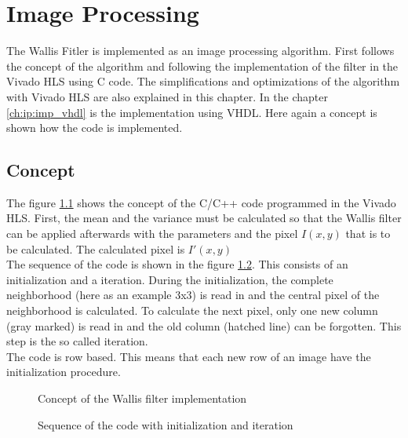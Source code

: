 %
%
\chapter{Image Processing}  \label{chapt:image_processing}
The Wallis Fitler is implemented as an image processing algorithm. First follows the concept of the algorithm and following the implementation of the filter in the Vivado HLS using C code. The simplifications and optimizations of the algorithm with Vivado HLS are also explained in this chapter. In the chapter \ref{ch:ip:imp_vhdl} is the implementation using VHDL. Here again a concept is shown how the code is implemented.

\section{Concept} \label{ch:ip:concept}
The figure \ref{fig:concept} shows the concept of the C/C++ code programmed in the Vivado HLS. First, the mean and the variance must be calculated so that the Wallis filter can be applied afterwards with the parameters and the pixel $I(x,y)$ that is to be calculated. The calculated pixel is $I'(x,y)$ \\
The sequence of the code is shown in the figure \ref{fig:sequence}. This consists of an initialization and a iteration. During the initialization, the complete neighborhood (here as an example 3x3) is read in and the central pixel of the neighborhood is calculated. To calculate the next pixel, only one new column (gray marked) is read in and the old column (hatched line) can be forgotten. This step is the so called iteration.\\
The code is row based. This means that each new row of an image have the initialization procedure.

\begin{figure}[tb!]
    \centering
    \begin{adjustbox}{max width=\textwidth}
        
    \end{adjustbox}
    \caption{Concept of the Wallis filter implementation}
    \label{fig:concept}
\end{figure}

\begin{figure}[tb!]
    \centering
    \begin{adjustbox}{max width=\textwidth}
        
    \end{adjustbox}
    \caption{Sequence of the code with initialization and iteration}
    \label{fig:sequence}
\end{figure}


